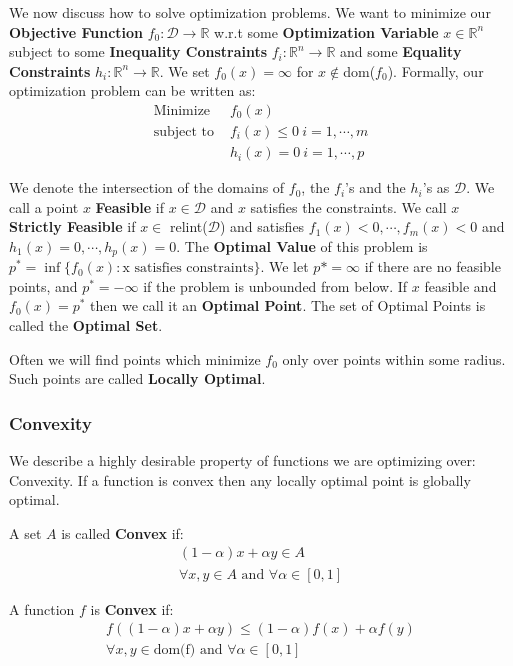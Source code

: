 \documentclass[]{article}
\theoremstyle{mattstyle}
\theoremstyle{definition}
\begin{document}
We now discuss how to solve optimization problems. We want to minimize our \textbf{Objective Function} $f_0 : \mathcal{D} \rightarrow \mathbb{R}$ w.r.t some  \textbf{Optimization Variable} $x \in \mathbb{R}^n$ subject to some \textbf{Inequality Constraints} $f_i: \mathbb{R}^n \rightarrow \mathbb{R}$ and some \textbf{Equality Constraints} $h_i: \mathbb{R}^n \rightarrow \mathbb{R}$.
We set $f_0(x) = \infty$ for $x \notin$dom($f_0$).
Formally, our optimization problem can be written as:
\begin{align*}
\text{Minimize } & f_0(x) \\
\text{subject to } & f_i(x) \le 0 \ i = 1, \cdots, m\\
& h_i(x) = 0 \ i = 1, \cdots, p
\end{align*}

We denote the intersection of the domains of $f_0$, the $f_i$'s and the $h_i$'s as $\mathcal{D}$. We call a point $x$ \textbf{Feasible} if $x\in \mathcal{D}$ and $x$ satisfies the constraints. We call $x$ \textbf{Strictly Feasible} if $x\in$ relint($\mathcal{D}$) and satisfies $f_1(x)<0, \cdots, f_m(x)<0$ and $h_1(x)=0, \cdots, h_p(x)=0$. The \textbf{Optimal Value} of this problem is $p^*=\inf\{f_0(x): \text{x satisfies constraints}\}$. We let $p* = \infty$ if there are no feasible points, and $p^*=-\infty$ if the problem is unbounded from below. If $x$ feasible and $f_0(x) = p^*$ then we call it an \textbf{Optimal Point}. The set of Optimal Points is called the \textbf{Optimal Set}.

Often we will find points which minimize $f_0$ only over points within some radius. Such points are called \textbf{Locally Optimal}.

\subsubsection{Convexity}

We describe a highly desirable property of functions we are optimizing over: Convexity. If a function is convex then any locally optimal point is globally optimal.

A set $A$ is called \textbf{Convex} if:
\begin{align*}
(1-\alpha)x + \alpha y \in A \\
\forall x,y\in A \text{ and } \forall\alpha \in [0,1]
\end{align*} 

A function $f$ is \textbf{Convex} if:
\begin{align*}
f((1-\alpha)x + \alpha y) \le (1-\alpha)f(x) + \alpha f(y)\\
\forall x,y\in \text{dom(f)}\text{ and } \forall\alpha \in [0,1]
\end{align*} 
\end{document}
